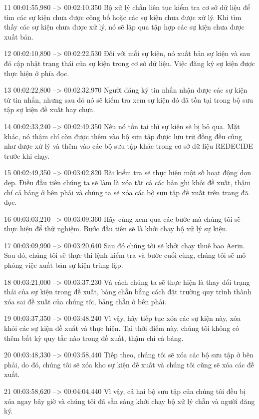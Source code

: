 11
00:01:55,980 --> 00:02:10,350
Bộ xử lý chẵn liên tục kiểm tra cơ sở dữ liệu để tìm các sự kiện chưa được công bố hoặc các sự kiện chưa được xử lý.  Khi tìm thấy các sự kiện chưa được xử lý, nó sẽ lặp qua tập hợp các sự kiện chưa được xuất bản.

12
00:02:10,890 --> 00:02:22,530
Đối với mỗi sự kiện, nó xuất bản sự kiện và sau đó cập nhật trạng thái của sự kiện trong cơ sở dữ liệu.  Việc đăng ký sự kiện được thực hiện ở phía đọc.

13
00:02:22,800 --> 00:02:32,970
Người đăng ký tin nhắn nhận được các sự kiện từ tin nhắn, nhưng sau đó nó sẽ kiểm tra xem sự kiện đó đã tồn tại trong bộ sưu tập sự kiện đề xuất hay chưa.

14
00:02:33,240 --> 00:02:49,350
Nếu nó tồn tại thì sự kiện sẽ bị bỏ qua.  Mặt khác, nó thậm chí còn được thêm vào bộ sưu tập được lưu trữ đồng đều cũng như được xử lý và thêm vào các bộ sưu tập khác trong cơ sở dữ liệu REDECIDE trước khi chạy.

15
00:02:49,350 --> 00:03:02,820
Bài kiểm tra sẽ thực hiện một số hoạt động dọn dẹp.  Điều đầu tiên chúng ta sẽ làm là xóa tất cả các bản ghi khỏi đề xuất, thậm chí cả bảng ở bên phải và chúng ta sẽ xóa các bộ sưu tập đề xuất trên trang đã đọc.

16
00:03:03,210 --> 00:03:09,360
Hãy cùng xem qua các bước mà chúng tôi sẽ thực hiện để thử nghiệm.  Bước đầu tiên sẽ là khởi chạy bộ xử lý sự kiện.

17
00:03:09,990 --> 00:03:20,640
Sau đó chúng tôi sẽ khởi chạy thuê bao Aerin.  Sau đó, chúng tôi sẽ thực thi lệnh kiểm tra và bước cuối cùng, chúng tôi sẽ mô phỏng việc xuất bản sự kiện trùng lặp.

18
00:03:21,000 --> 00:03:37,230
Và cách chúng ta sẽ thực hiện là thay đổi trạng thái của sự kiện trong đề xuất, bảng chẵn bằng cách đặt trường quy trình thành xóa sai đề xuất của chúng tôi, bảng chẵn ở bên phải.

19
00:03:37,350 --> 00:03:48,240
Vì vậy, hãy tiếp tục xóa các sự kiện này, xóa khỏi các sự kiện đề xuất và thực hiện.  Tại thời điểm này, chúng tôi không có thêm bất kỳ quy tắc nào trong đề xuất, thậm chí cả bảng.

20
00:03:48,330 --> 00:03:58,440
Tiếp theo, chúng tôi sẽ xóa các bộ sưu tập ở bên phải, do đó, chúng tôi sẽ xóa kho sự kiện đề xuất và chúng tôi cũng sẽ xóa các đề xuất.

21
00:03:58,620 --> 00:04:04,440
Vì vậy, cả hai bộ sưu tập của chúng tôi đều bị xóa ngay bây giờ và chúng tôi đã sẵn sàng khởi chạy bộ xử lý chẵn và người đăng ký.

